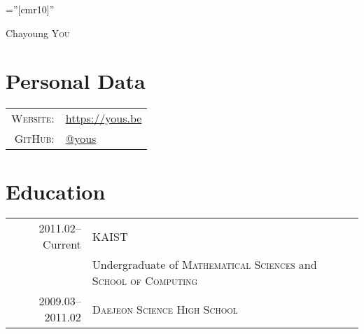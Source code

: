 \documentclass[a4paper,10pt]{article}
\begin{document}

\pagestyle{empty} %

\font\fb=''[cmr10]'' %

\par{\centering
  {\Huge Chayoung \textsc{You}
}\bigskip\par}

\section{Personal Data}

\begin{tabular}{rl}
  \textsc{Website:} & \url{https://yous.be} \\
  \textsc{GitHub:}  & \href{https://github.com/yous}{@yous} \\
\end{tabular}

\section{Education}
\begin{tabular}{rl}
  2011.02--Current & \textsc{KAIST} \\
                   & Undergraduate of \textsc{Mathematical Sciences} and \textsc{School of Computing} \\
  2009.03--2011.02 & \textsc{Daejeon Science High School}
\end{tabular}

\end{document}
